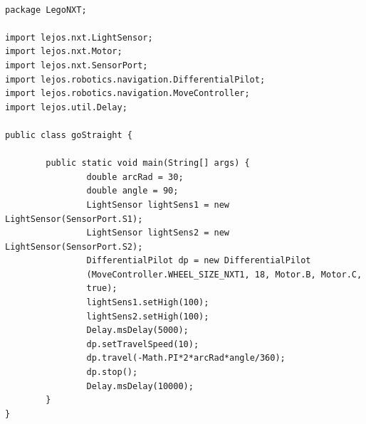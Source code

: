 \documentclass[a4paper, 12pt]{article}
\begin{document}
\begin{lstlisting}

package LegoNXT;

import lejos.nxt.LightSensor;
import lejos.nxt.Motor;
import lejos.nxt.SensorPort;
import lejos.robotics.navigation.DifferentialPilot;
import lejos.robotics.navigation.MoveController;
import lejos.util.Delay;

public class goStraight {

        public static void main(String[] args) {
                double arcRad = 30;
                double angle = 90;
                LightSensor lightSens1 = new LightSensor(SensorPort.S1);
                LightSensor lightSens2 = new LightSensor(SensorPort.S2);
                DifferentialPilot dp = new DifferentialPilot
                (MoveController.WHEEL_SIZE_NXT1, 18, Motor.B, Motor.C,
                true);
                lightSens1.setHigh(100);
                lightSens2.setHigh(100);
                Delay.msDelay(5000);
                dp.setTravelSpeed(10);
                dp.travel(-Math.PI*2*arcRad*angle/360);
                dp.stop();
                Delay.msDelay(10000);
        }
}

\end{lstlisting}
\end{document}
